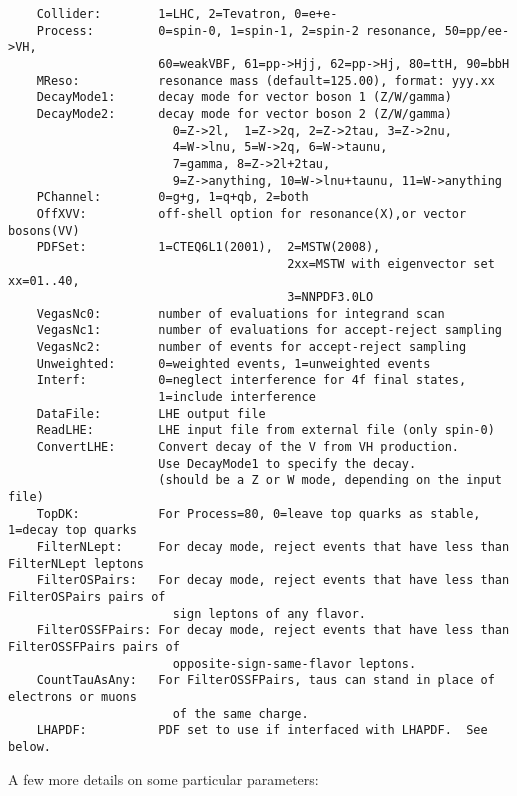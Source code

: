 \documentclass[aps,superscriptaddress,nofootinbib]{revtex4}
\begin{document}
\begin{verbatim}
    Collider:        1=LHC, 2=Tevatron, 0=e+e-
    Process:         0=spin-0, 1=spin-1, 2=spin-2 resonance, 50=pp/ee->VH,
                     60=weakVBF, 61=pp->Hjj, 62=pp->Hj, 80=ttH, 90=bbH
    MReso:           resonance mass (default=125.00), format: yyy.xx
    DecayMode1:      decay mode for vector boson 1 (Z/W/gamma)
    DecayMode2:      decay mode for vector boson 2 (Z/W/gamma)
                       0=Z->2l,  1=Z->2q, 2=Z->2tau, 3=Z->2nu,
                       4=W->lnu, 5=W->2q, 6=W->taunu,
                       7=gamma, 8=Z->2l+2tau,
                       9=Z->anything, 10=W->lnu+taunu, 11=W->anything
    PChannel:        0=g+g, 1=q+qb, 2=both
    OffXVV:          off-shell option for resonance(X),or vector bosons(VV)
    PDFSet:          1=CTEQ6L1(2001),  2=MSTW(2008),
                                       2xx=MSTW with eigenvector set xx=01..40,
                                       3=NNPDF3.0LO
    VegasNc0:        number of evaluations for integrand scan
    VegasNc1:        number of evaluations for accept-reject sampling
    VegasNc2:        number of events for accept-reject sampling
    Unweighted:      0=weighted events, 1=unweighted events
    Interf:          0=neglect interference for 4f final states,
                     1=include interference
    DataFile:        LHE output file
    ReadLHE:         LHE input file from external file (only spin-0)
    ConvertLHE:      Convert decay of the V from VH production.
                     Use DecayMode1 to specify the decay.
                     (should be a Z or W mode, depending on the input file)
    TopDK:           For Process=80, 0=leave top quarks as stable, 1=decay top quarks
    FilterNLept:     For decay mode, reject events that have less than FilterNLept leptons
    FilterOSPairs:   For decay mode, reject events that have less than FilterOSPairs pairs of
                       sign leptons of any flavor.
    FilterOSSFPairs: For decay mode, reject events that have less than FilterOSSFPairs pairs of
                       opposite-sign-same-flavor leptons.
    CountTauAsAny:   For FilterOSSFPairs, taus can stand in place of electrons or muons
                       of the same charge.
    LHAPDF:          PDF set to use if interfaced with LHAPDF.  See below.
\end{verbatim}

\noindent
A few more details on some particular parameters:
\end{document}
